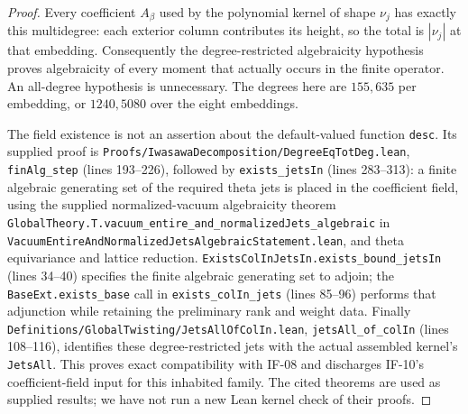 \begin{proof}
Every coefficient $A_\beta$ used by the polynomial kernel of shape
$\nu_j$ has exactly this multidegree: each exterior column contributes
its height, so the total is $|\nu_j|$ at that embedding. Consequently
the degree-restricted algebraicity hypothesis proves algebraicity of
every moment that actually occurs in the finite operator. An
all-degree hypothesis is unnecessary. The degrees here are
$155,635$ per embedding, or $1240,5080$ over the eight embeddings.

The field existence is not an assertion about the default-valued
function \texttt{desc}. Its supplied proof is
\texttt{Proofs/IwasawaDecomposition/DegreeEqTotDeg.lean},
\texttt{finAlg\_step} (lines 193--226), followed by
\texttt{exists\_jetsIn} (lines 283--313): a finite algebraic generating
set of the required theta jets is placed in the coefficient field,
using the supplied normalized-vacuum algebraicity theorem
\texttt{GlobalTheory.T.vacuum\_entire\_and\_normalizedJets\_algebraic}
in \texttt{VacuumEntireAndNormalizedJetsAlgebraicStatement.lean},
and theta equivariance and lattice reduction.
\texttt{ExistsColInJetsIn.exists\_bound\_jetsIn} (lines 34--40)
specifies the finite algebraic generating set to adjoin; the
\texttt{BaseExt.exists\_base} call in \texttt{exists\_colIn\_jets}
(lines 85--96) performs that adjunction while retaining the preliminary
rank and weight data.
Finally \texttt{Definitions/GlobalTwisting/JetsAllOfColIn.lean},
\texttt{jetsAll\_of\_colIn} (lines 108--116), identifies these
degree-restricted jets with the actual assembled kernel's
\texttt{JetsAll}. This proves exact compatibility with IF-08 and
discharges IF-10's coefficient-field input for this inhabited family.
The cited theorems are used as supplied results; we have not run a
new Lean kernel check of their proofs.
\end{proof}

